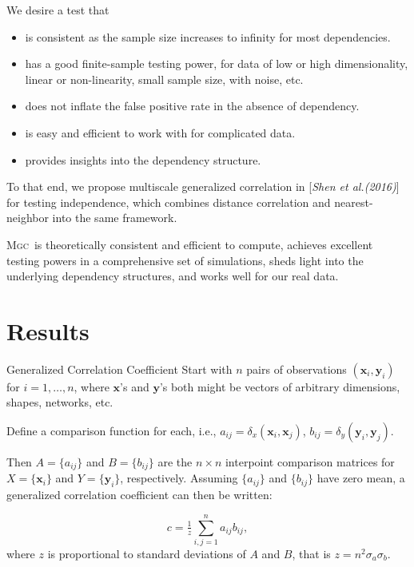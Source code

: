 \documentclass{beamer}
\newcommand{\G}{c}
\providecommand{\mb}[1]{\boldsymbol{#1}}
\providecommand{\sct}[1]{{\normalfont\textsc{#1}}}
\newcommand{\Mgc}{\sct{Mgc}}
\begin{document}
\begin{frame}
We desire a test that

\pause
\medskip
\begin{itemize}[<+->]
\item is consistent as the sample size increases to infinity for most dependencies.
\item has a good finite-sample testing power, for data of low or high dimensionality, linear or non-linearity, small sample size, with noise, etc.
\item does not inflate the false positive rate in the absence of dependency.
\item is easy and efficient to work with for complicated data.
\item provides insights into the dependency structure.
\end{itemize}
\pause
\medskip

To that end, we propose multiscale generalized correlation in [\textit{Shen et al.(2016)}]\cite{ShenEtAl2016} for testing independence, which combines distance correlation and nearest-neighbor into the same framework.

\pause
\medskip
\Mgc~is theoretically consistent and efficient to compute, achieves excellent testing powers in a comprehensive set of simulations, sheds light into the underlying dependency structures, and works well for our real data.
\end{frame}

\section{Results}
\begin{frame}{Generalized Correlation Coefficient}
Start with $n$ pairs of observations $(\mb{x}_i,\mb{y}_i)$ for $i=1,\ldots,n$, where $\mb{x}$'s and $\mb{y}$'s both might be vectors of arbitrary dimensions, shapes, networks, etc.  

\pause
\medskip
Define a comparison function for each, i.e., $a_{ij}=\delta_x(\mb{x}_i,\mb{x}_j)$, $b_{ij}=\delta_y(\mb{y}_i,\mb{y}_j)$. 
 
\pause
\medskip
Then $A=\{a_{ij}\}$ and $B=\{b_{ij}\}$ are the $n \times n$ interpoint comparison matrices for $X=\{\mb{x}_{i}\}$ and $Y=\{\mb{y}_{i}\}$, respectively. Assuming $\{a_{ij}\}$ and $\{b_{ij}\}$ have zero mean, a generalized correlation coefficient can then be written:

\pause
\begin{equation}
\label{generalCoef}
\G= \tfrac{1}{z} {\textstyle \sum_{i,j=1}^n a_{ij} b_{ij}},
\end{equation}
where $z$ is proportional to standard deviations of $A$ and $B$, that is $z=n^2\sigma_a \sigma_b$.
\end{frame}
\end{document}
